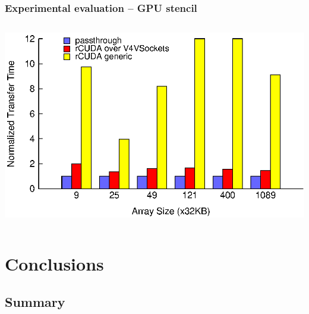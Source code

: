 \documentclass[red,slidestop,notes,compress,mathserif]{beamer}
\begin{document}
\begin{frame}
\frametitle{Experimental evaluation -- GPU stencil}
\begin{columns}
\includegraphics[width=\textwidth]{figures/matrixA_cublas_throughput.eps}
\end{columns}
\end{frame}

\section*{Conclusions}

\subsection*{Summary}
\end{document}
